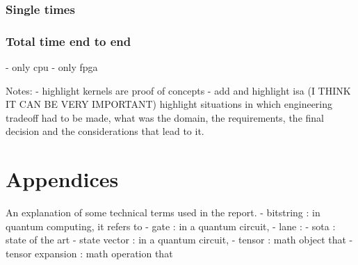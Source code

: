 \documentclass[12pt,oneside,a4paper]{article}
\begin{document}
\subsubsection{Single times}
\subsubsection{Total time end to end}
	- only cpu
	- only fpga

Notes:
	- highlight kernels are proof of concepts
	- add and highlight isa
	(I THINK IT CAN BE VERY IMPORTANT) highlight situations in which engineering tradeoff had to be made, what was the domain, the requirements, the final decision and the considerations that lead to it.






\printbibliography[title={\section{References}}]

\section{Appendices}
An explanation of some technical terms used in the report.
- bitstring : in quantum computing, it refers to
- gate : in a quantum circuit,
- lane :
- sota : state of the art
- state vector : in a quantum circuit,
- tensor : math object that
- tensor expansion : math operation that
\end{document}
